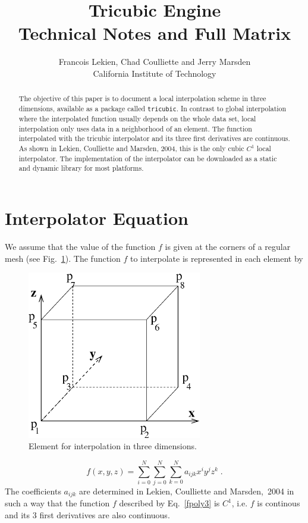 \documentclass{article}
\title{Tricubic Engine\\
Technical Notes and Full Matrix}
\author{Francois Lekien, Chad Coulliette and Jerry Marsden\\
California Institute of Technology}
\begin{document}
\maketitle

\begin{abstract}
The objective of this paper is to document a local interpolation scheme in three dimensions, available as a package called \verb+tricubic+. In contrast to global interpolation where the interpolated function usually depends on the whole data set, local interpolation only uses data in a neighborhood of an element. 
The function interpolated with the tricubic interpolator and its three first derivatives are continuous. As shown in Lekien, Coulliette and Marsden, 2004, this is the only cubic $C^1$ local interpolator.
The implementation of the interpolator can be downloaded as a static and dynamic library for most platforms.
\end{abstract}

\tableofcontents

\section{Interpolator Equation}

We assume that the value of the function $f$ is given at the corners of a regular mesh (see Fig.~\ref{figcube}). The function $f$ to interpolate is represented in each element by

\begin{figure}
\centering\includegraphics[width=3in]{1cube}
\caption{Element for interpolation in three dimensions.}
\label{figcube}
\end{figure}

\begin{equation}
f(x,y,z) = \sum _{i=0}^{N} \sum _{j=0}^{N} \sum _{k=0}^{N} a_{i j k} x^i y^j z^k \; .
\label{fpoly3}
\end{equation} The coefficients $a_{i j k}$ are determined in Lekien, Coulliette and Marsden,~2004  in such a way that the function $f$ described by Eq.~\ref{fpoly3} is $C^1$, i.e. $f$ is continous and its 3 first derivatives are also continuous.
\end{document}
